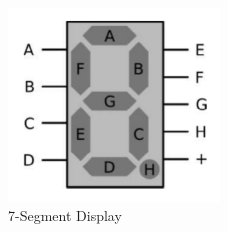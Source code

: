 \documentclass[pdftex,12pt,a4paper]{article}
\begin{document}
\begin{figure}[H]
    \centering
    \includegraphics[width=0.5\textwidth]{7segmentdisplay.png}
    \caption{7-Segment Display}
    \label{fig:sevensegdisp}
\end{figure}
\end{document}
